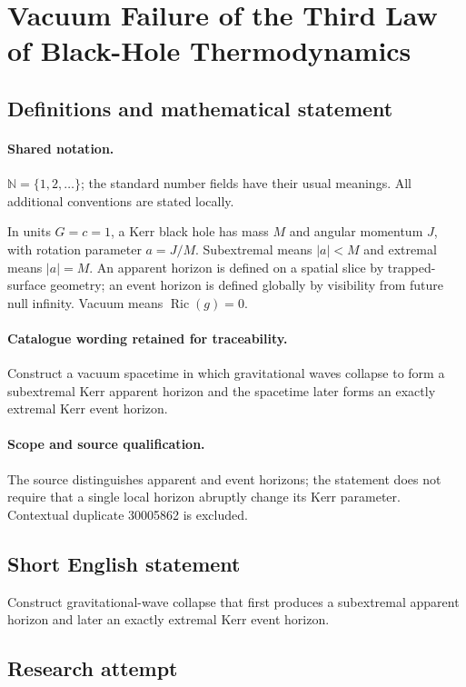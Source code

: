 \documentclass[11pt]{article}
\begin{document}
\section{Vacuum Failure of the Third Law of Black-Hole Thermodynamics}\label{statement}

\subsection{Definitions and mathematical statement}

\paragraph{Shared notation.}$\mathbb N=\{1,2,\ldots\}$; the standard number fields have their usual meanings. All additional conventions are stated locally.


In units $G=c=1$, a Kerr black hole has mass $M$ and angular momentum $J$, with rotation parameter $a=J/M$. Subextremal means $|a|<M$ and extremal means $|a|=M$. An apparent horizon is defined on a spatial slice by trapped-surface geometry; an event horizon is defined globally by visibility from future null infinity. Vacuum means $\operatorname{Ric}(g)=0$.

\paragraph{Catalogue wording retained for traceability.}
Construct a vacuum spacetime in which gravitational waves collapse to form a subextremal Kerr apparent horizon and the spacetime later forms an exactly extremal Kerr event horizon.

\paragraph{Scope and source qualification.}The source distinguishes apparent and event horizons; the statement does not require that a single local horizon abruptly change its Kerr parameter. Contextual duplicate 30005862 is excluded.
\subsection{Short English statement}
Construct gravitational-wave collapse that first produces a subextremal apparent horizon and later an exactly extremal Kerr event horizon.
\subsection{Research attempt}
\end{document}
